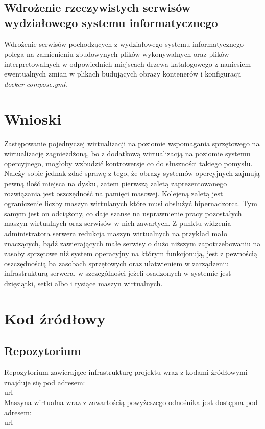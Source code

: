 \documentclass[polish, a4paper, 12pt, oneside]{book}
\begin{document}
\section{Wdrożenie rzeczywistych serwisów wydziałowego systemu informatycznego}
Wdrożenie serwisów pochodzących z wydziałowego systemu informatycznego polega na zamienieniu zbudowynych plików wykonywalnych oraz plików interpretowalnych w odpowiednich miejscach drzewa katalogowego z naniesiem ewentualnych zmian w plikach budujących obrazy kontenerów i konfiguracji \textit{docker-compose.yml}.

\chapter{Wnioski}
Zastępowanie pojednyczej wirtualizacji na poziomie wspomagania sprzętowego na wirtualizację zagnieżdżoną, bo z dodatkową wirtualizacją na poziomie systemu opercyjnego, mogłoby wzbudzić kontrowersje co do słuszności takiego pomysłu. Należy sobie jednak zdać sprawę z tego, że obrazy systemów opercyjnych zajmują pewną ilość miejsca na dysku, zatem pierwszą zaletą zaprezentowanego rozwiązania jest oszczędność na pamięci masowej. Kolejeną zaletą jest ograniczenie liczby maszyn wirtulanych które musi obsłużyć hipernadzorca. Tym samym jest on odciążony, co daje szanse na usprawnienie pracy pozostałych maszyn wirtualnych oraz serwisów w nich zawartych. Z punktu widzenia administratora serwera redukcja maszyn wirtualnych na przykład mało znaczących, bądź zawierających małe serwisy o dużo niższym zapotrzebowaniu na zasoby sprzętowe niż system operacyjny na którym funkcjonują, jest z pewnością oszczędnością ba zasobach sprzętowych oraz ułatwieniem w zarządzeniu infrastrukturą serwera, w szczególności jeżeli osadzonych w systemie jest dzięsiątki, setki albo i tysiące maszyn wirtualnych.


\chapter{Kod źródłowy}

\section{Repozytorium}
Repozytorium zawierające infrastrukturę projektu wraz z kodami źródłowymi znajduje się pod adresem:\\
url\\
Maszyna wirtualna wraz z zawartością powyżeszego odnośnika jest dostępna pod adresem:\\
url\\
\end{document}
